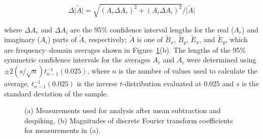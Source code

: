 \documentclass[draft,linenumbers]{agujournal2018}
\begin{document}
\begin{equation}
\Delta\big|\widetilde{A}\big| = \sqrt{(A_r\Delta A_r)^2 + (A_i\Delta A_i)^2} / \big|\widetilde{A}\big|
\end{equation}

\noindent
where $\Delta A_r$ and $\Delta A_i$ are the 95\% confidence interval lengths for the real ($A_r$) and imaginary ($A_i$) parts of $\widetilde{A}$, respectively; $\widetilde{A}$ is one of $\widetilde{B}_x$, $\widetilde{B}_y$, $\widetilde{E}_x$, and $\widetilde{E}_y$, which are frequency--domain averages shown in Figure~\ref{fig:timeseries}(b). The lengths of the 95\% symmetric confidence intervals for the averages $A_r$ and $A_i$ were determined using $\pm 2 (s/\sqrt{n})t^{-1}_{n-1}(0.025)$, where $n$ is the number of values used to calculate the average, $t^{-1}_{n-1}(0.025)$ is the inverse $t$-distribution evaluated at $0.025$ and $s$ is the standard deviation of the sample.

\begin{figure}
     \hspace{10pt}
     \caption{(a) Measurements used for analysis after mean subtraction and despiking. (b) Magnitudes of discrete Fourier transform coefficients for measurements in (a).}
  \label{fig:timeseries}
\end{figure}
\end{document}
